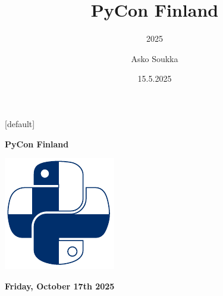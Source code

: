 \documentclass[12pt,aspectratio=169]{beamer}
\title{PyCon Finland}
\subtitle{2025}
\date{15.5.2025}
\author{Asko Soukka}
\begin{document}

{
\begin{frame}[plain]
\end{frame}
}


[default]
\begin{frame}
\vfill
\centering \huge \textbf{PyCon Finland}
\par
\centering \includegraphics[height=0.50\paperheight]{images/PyCon-Finland.pdf}
\par
\textbf{Friday, October 17th 2025}
\vfill
\end{frame}

\end{document}
